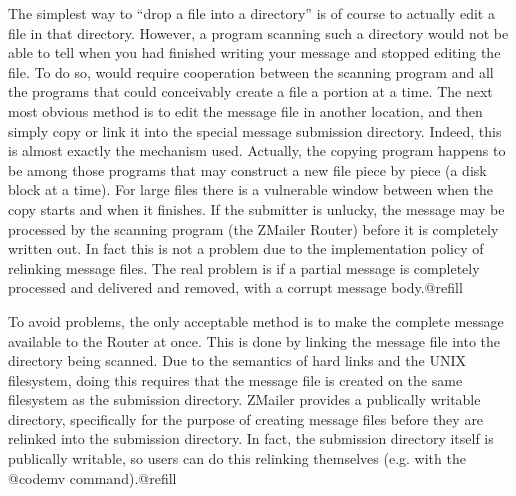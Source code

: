 The simplest way to ``drop a file into a directory'' is of course to
actually edit a file in that directory.  However, a program scanning
such a directory would not be able to tell when you had finished
writing your message and stopped editing the file. To do so, would
require cooperation between the scanning program and all the programs
that could conceivably create a file a portion at a time. The next most
obvious method is to edit the message file in another location, and
then simply copy or link it into the special message submission
directory.  Indeed, this is almost exactly the mechanism used.
Actually, the copying program happens to be among those programs that
may construct a new file piece by piece (a disk block at a time). For
large files there is a vulnerable window between when the copy starts
and when it finishes.  If the submitter is unlucky, the message may be
processed by the scanning program (the ZMailer Router) before it is
completely written out.  In fact this is not a problem due to the
implementation policy of relinking message files. The real problem is
if a partial message is completely processed and delivered and removed,
with a corrupt message body.@refill

To avoid problems, the only acceptable method is to make the complete
message available to the Router at once.  This is done by linking the
message file into the directory being scanned.  Due to the semantics of
hard links and the UNIX filesystem, doing this requires that the
message file is created on the same filesystem as the submission
directory.  ZMailer provides a publically writable directory,
specifically for the purpose of creating message files before they are
relinked into the submission directory.  In fact, the submission
directory itself is publically writable, so users can do this relinking
themselves (e.g. with the @code{mv} command).@refill

